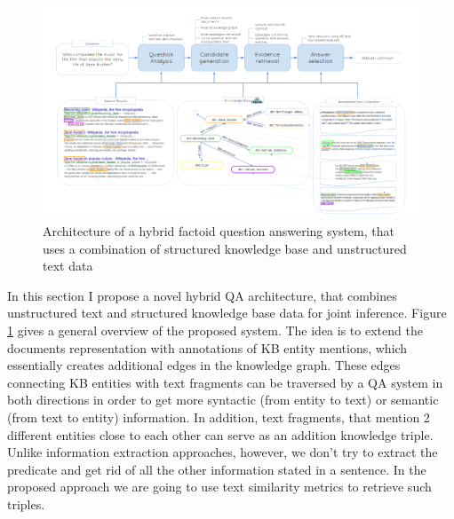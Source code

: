 \begin{figure}
\centering
\includegraphics[width=\textwidth]{img/text_and_kb}
\caption{Architecture of a hybrid factoid question answering system, that uses a combination of structured knowledge base and unstructured text data}
\label{fig:text_kb}
\end{figure}

In this section I propose a novel hybrid QA architecture, that combines unstructured text and structured knowledge base data for joint inference.
Figure \ref{fig:text_kb} gives a general overview of the proposed system.
The idea is to extend the documents representation with annotations of KB entity mentions, which essentially creates additional edges in the knowledge graph.
These edges connecting KB entities with text fragments can be traversed by a QA system in both directions in order to get more syntactic (from entity to text) or semantic (from text to entity) information.
In addition, text fragments, that mention 2 different entities close to each other can serve as an addition knowledge triple.
Unlike information extraction approaches, however, we don't try to extract the predicate and get rid of all the other information stated in a sentence.
In the proposed approach we are going to use text similarity metrics to retrieve such triples.

